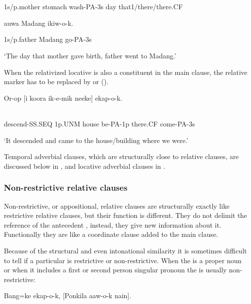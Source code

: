 \ea%
\label{ex:x1625}
 \\
      \\
\glt
\z

1s/p.mother  stomach  wash-PA-3s  day  that1/there/there.CF  

auwa  Madang  ikiw-o-k.

1s/p.father  Madang  go-PA-3s

`The day that mother gave birth, father went to Madang.'

When the relativized locative  is also a constituent in the main clause, the relative marker has to be replaced by  or  ().

\ea%
\label{ex:x1622}
\gll Or-op  [i  koora  ik-e-mik  neeke]  ekap-o-k. \\
      \\
\glt
\z

descend-SS.SEQ  1p.UNM  house  be-PA-1p  there.CF  come-PA-3s

`It descended and came to the house/building where we were.'

Temporal adverbial clauses, which are structurally close to relative clauses, are discussed below in , and locative adverbial clauses in .

\subsubsection[Non-restrictive relative clauses]{Non-restrictive relative clauses}
\hypertarget{RefHeading23381935131865}{}
Non-restrictive, or appositional, relative clauses are structurally exactly like restrictive relative clauses, but their function is different. They do not delimit the reference of the antecedent , instead, they give new information about it. Functionally they are like a coordinate clause added to the main clause.

Because of the structural and even intonational similarity it is sometimes difficult to tell if a particular  is restrictive or non-restrictive. When the  is a proper noun or when it includes a first or second person singular pronoun the  is usually non-restrictive:

\ea%
\label{ex:x1567}
\gll Bang=ke  ekap-o-k,  [Ponkila  aaw-o-k  nain]. \\
      \\
\glt
\z

